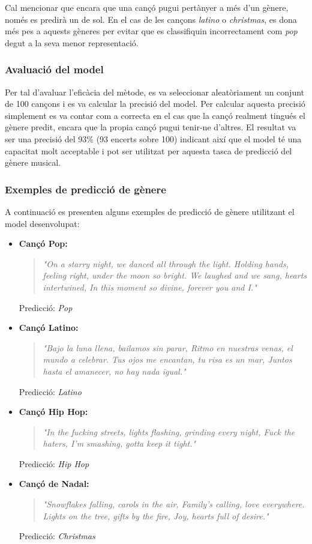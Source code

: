 Cal mencionar que encara que una cançó pugui pertànyer a més d'un gènere, només es predirà un de sol. En el cas de les cançons \textit{latino} o \textit{christmas}, es dona més pes a aquests gèneres per evitar que es classifiquin incorrectament com \textit{pop} degut a la seva menor representació.

\subsubsection{Avaluació del model}

Per tal d'avaluar l'eficàcia del mètode, es va seleccionar aleatòriament un conjunt de 100 cançons i es va calcular la precisió del model. Per calcular aquesta precisió simplement es va contar com a correcta en el cas que la cançó realment tingués el gènere predit, encara que la propia cançó pugui tenir-ne d'altres. El resultat va ser una precisió del 93\% (93 encerts sobre 100) indicant així que el model té una capacitat molt acceptable i pot ser utilitzat per aquesta tasca de predicció del gènere musical.

\subsubsection{Exemples de predicció de gènere}

A continuació es presenten alguns exemples de predicció de gènere utilitzant el model desenvolupat:

\begin{itemize}
    \item \textbf{Cançó Pop:}
    \begin{quote}
    \textit{"On a starry night, we danced all through the light. Holding hands, feeling right, under the moon so bright. We laughed and we sang, hearts intertwined, In this moment so divine, forever you and I."}
    \end{quote}
    Predicció: \textit{Pop}

    \item \textbf{Cançó Latino:}
    \begin{quote}
    \textit{"Bajo la luna llena, bailamos sin parar, Ritmo en nuestras venas, el mundo a celebrar. Tus ojos me encantan, tu risa es un mar, Juntos hasta el amanecer, no hay nada igual."}
    \end{quote}
    Predicció: \textit{Latino}

    \item \textbf{Cançó Hip Hop:}
    \begin{quote}
    \textit{"In the fucking streets, lights flashing, grinding every night, Fuck the haters, I'm smashing, gotta keep it tight."}
    \end{quote}
    Predicció: \textit{Hip Hop}

    \item \textbf{Cançó de Nadal:}
    \begin{quote}
    \textit{"Snowflakes falling, carols in the air, Family's calling, love everywhere. Lights on the tree, gifts by the fire, Joy, hearts full of desire."}
    \end{quote}
    Predicció: \textit{Christmas}
\end{itemize}

